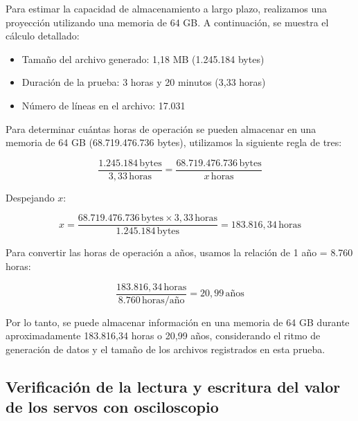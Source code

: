         Para estimar la capacidad de almacenamiento a largo plazo, realizamos una proyección utilizando una memoria de 64 GB. A continuación, se muestra el cálculo detallado:\vspace{5 px}

        \vspace{5 px}
        \begin{itemize}
            \item Tamaño del archivo generado: 1,18 MB (1.245.184 bytes)
            \item Duración de la prueba: 3 horas y 20 minutos (3,33 horas)
            \item Número de líneas en el archivo: 17.031
        \end{itemize}
        \vspace{5 px}

        Para determinar cuántas horas de operación se pueden almacenar en una memoria de 64 GB (68.719.476.736 bytes), utilizamos la siguiente regla de tres:

        \begin{equation}
        \frac{1.245.184 \, \text{bytes}}{3,33 \, \text{horas}} = \frac{68.719.476.736 \, \text{bytes}}{x \, \text{horas}}
        \end{equation}

        Despejando \( x \):

        \begin{equation}
        x = \frac{68.719.476.736 \, \text{bytes} \times 3,33 \, \text{horas}}{1.245.184 \, \text{bytes}} = 183.816,34 \, \text{horas}
        \end{equation}

        Para convertir las horas de operación a años, usamos la relación de 1 año = 8.760 horas:

        \begin{equation}
        \frac{183.816,34 \, \text{horas}}{8.760 \, \text{horas/año}} = 20,99 \, \text{años}
        \end{equation}

        \vspace{5 px}

        Por lo tanto, se puede almacenar información en una memoria de 64 GB durante aproximadamente 183.816,34 horas o 20,99 años, considerando el ritmo de generación de datos y el tamaño de los archivos registrados en esta prueba.\vspace{5 px}


    \subsection{Verificación de la lectura y escritura del valor de los servos con osciloscopio}

